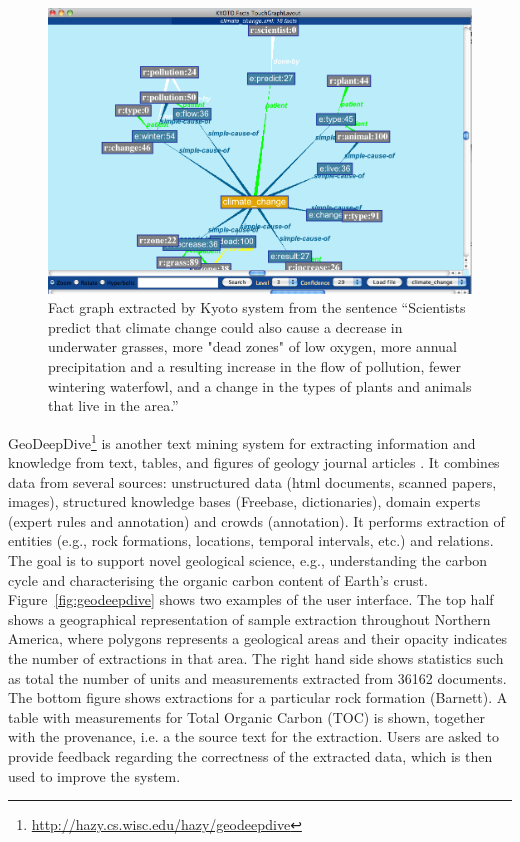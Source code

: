 \begin{figure}
\begin{center}
\includegraphics[scale=0.35]{figures/kyoto.png}
 \caption{Fact graph extracted by Kyoto system from the sentence ``Scientists predict that climate change could also cause a decrease in underwater grasses, more "dead zones" of low oxygen, more annual precipitation and a resulting increase in the flow of pollution, fewer wintering waterfowl, and a change in the types of plants and animals that live in the area.''}
\label{fig:kyoto}
\end{center}
\end{figure} 


GeoDeepDive\footnote{\url{http://hazy.cs.wisc.edu/hazy/geodeepdive}} is another text mining system for extracting information and knowledge from text, tables, and figures of geology journal articles \citep{Zhang2013GeoDeepDive}.
It combines data from several sources: unstructured data (html documents, scanned papers, images), structured knowledge bases (Freebase, dictionaries), domain experts (expert rules and annotation) and crowds (annotation).
It performs extraction of entities (e.g., rock formations, locations, temporal intervals, etc.) and relations.
The goal is to support novel geological science, e.g., understanding the carbon cycle and characterising the organic carbon content of Earth’s crust.
Figure~\ref{fig:geodeepdive} shows two examples of the user interface.
The top half shows a geographical representation of sample extraction throughout Northern America, where polygons represents a geological areas and their opacity indicates the number of extractions in that area.
The right hand side shows statistics such as total the number of units and measurements extracted from 36162 documents.
The bottom figure shows extractions for a particular rock formation (Barnett).
A table with measurements for Total Organic Carbon (TOC) is shown, together with the provenance, i.e. a the source text for the extraction.
Users are asked to provide feedback regarding the correctness of the extracted data, which is then used to improve the system.

